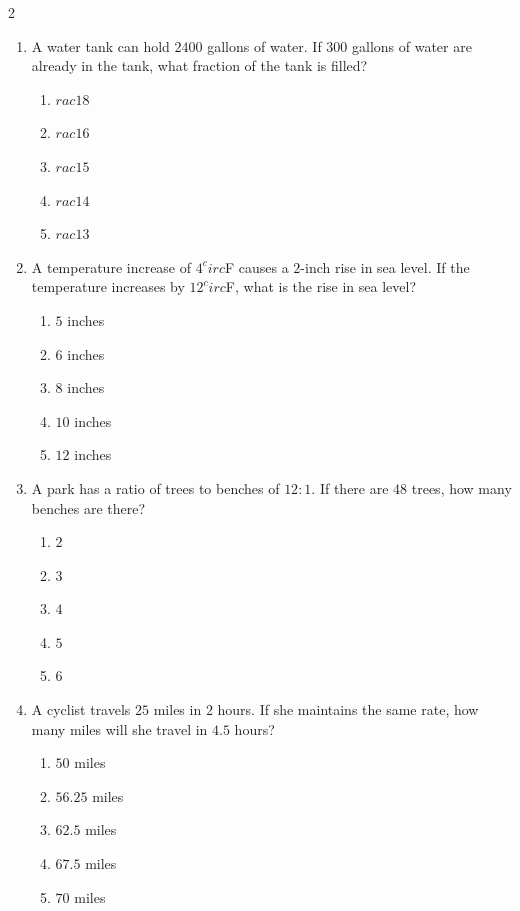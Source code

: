 \documentclass[10pt]{article}
\begin{document}
\begin{multicols}{2}
\begin{enumerate}[label=\textbf{Q\arabic*.}, leftmargin=*, itemsep=6pt, parsep=0pt]
  \item \small A water tank can hold $2400$ gallons of water. If $300$ gallons of water are already in the tank, what fraction of the tank is filled?
  \begin{enumerate}[label=(\Alph*), leftmargin=0.6cm, nosep, itemsep=2pt]
    \item $rac{1}{8}$
    \item $rac{1}{6}$
    \item $rac{1}{5}$
    \item $rac{1}{4}$
    \item $rac{1}{3}$
  \end{enumerate}

  \item \small A temperature increase of $4^circ$F causes a $2$-inch rise in sea level. If the temperature increases by $12^circ$F, what is the rise in sea level?
  \begin{enumerate}[label=(\Alph*), leftmargin=0.6cm, nosep, itemsep=2pt]
    \item $5$ inches
    \item $6$ inches
    \item $8$ inches
    \item $10$ inches
    \item $12$ inches
  \end{enumerate}

  \item \small A park has a ratio of trees to benches of $12:1$. If there are $48$ trees, how many benches are there?
  \begin{enumerate}[label=(\Alph*), leftmargin=0.6cm, nosep, itemsep=2pt]
    \item $2$
    \item $3$
    \item $4$
    \item $5$
    \item $6$
  \end{enumerate}

  \item \small A cyclist travels $25$ miles in $2$ hours. If she maintains the same rate, how many miles will she travel in $4.5$ hours?
  \begin{enumerate}[label=(\Alph*), leftmargin=0.6cm, nosep, itemsep=2pt]
    \item $50$ miles
    \item $56.25$ miles
    \item $62.5$ miles
    \item $67.5$ miles
    \item $70$ miles
  \end{enumerate}


\end{enumerate}
\end{multicols}
\end{document}
